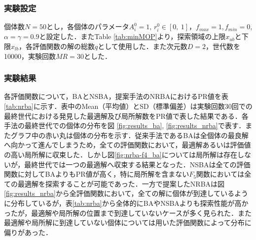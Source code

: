 \documentclass[a4j,11pt]{jarticle}
\begin{document}
\subsubsection{実験設定}
\label{sss:NRBA-setup}
個体数$N=50$とし，各個体のパラメータ$A_i^0=1$, $r_i^0 \in [0,\ 1]$，$f_{max}=1, f_{min}=0$, $\alpha = \gamma = 0.9$と設定した．またTable \ref{tab:minMOP}より，探索領域の上限$x_{ub}$と下限$x_{lb}$，各評価関数の解の総数$q$として使用した．また次元数$D=2$，世代数を10000，実験回数$MR=30$とした．

\subsubsection{実験結果}
\label{sss:NRBA-results}
各評価関数について，BAとNSBA，提案手法のNRBAにおけるPR値を表\ref{tab:nrba}に示す．表中のMean（平均値）とSD（標準偏差）は実験回数30回での最終世代における発見した最適解及び局所解数をPR値で表した結果である．各手法の最終世代での個体の分布を図 \ref{fig:results_ba}, \ref{fig:results_nrba}で表す．またグラフ中の赤い丸は個体の分布を示す．従来手法であるBAは全個体の最良解へ向かって進んでしまうため，全ての評価関数において，最適解あるいは評価値の高い局所解に収束した．しかし図\ref{fig:nrba-f4_ba}については局所解は存在しないが，最終世代では一つの最適解へ収束する結果となった．NSBAは全ての評価関数に対してBAよりもPR値が高く，特に局所解を含まない$F_5$関数においては全ての最適解を探索することが可能であった．一方で提案したNRBAは図\ref{fig:results_nrba}から全評価関数において，全ての解に個体が到達しているように分布しているが，表\ref{tab:nrba}から全体的にBAやNSBAよりも探索性能が高かったが，最適解や局所解の位置まで到達していないケースが多く見られた．また最適解や局所解に到達していない個体については用いた評価関数によって分布に偏りがあった．
\end{document}

